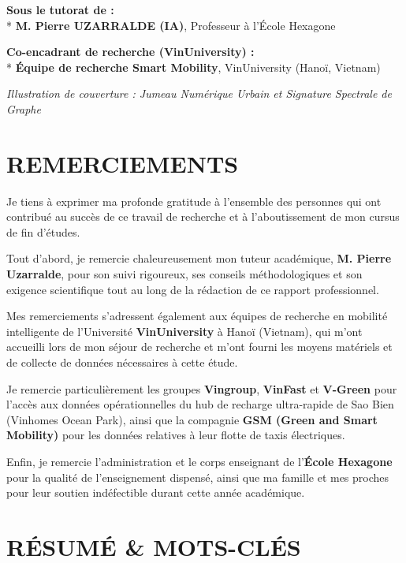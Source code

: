 \documentclass[10pt, a4paper]{article}
\begin{document}
\textbf{Sous le tutorat de :}\\
* \textbf{M. Pierre UZARRALDE (IA)}, Professeur à l'École Hexagone

\textbf{Co-encadrant de recherche (VinUniversity) :}\\
* \textbf{Équipe de recherche Smart Mobility}, VinUniversity (Hanoï,
Vietnam)

\emph{Illustration de couverture : Jumeau Numérique Urbain et Signature
Spectrale de Graphe}

\newpage

\section{REMERCIEMENTS}\label{remerciements}

Je tiens à exprimer ma profonde gratitude à l'ensemble des personnes qui
ont contribué au succès de ce travail de recherche et à l'aboutissement
de mon cursus de fin d'études.

Tout d'abord, je remercie chaleureusement mon tuteur académique,
\textbf{M. Pierre Uzarralde}, pour son suivi rigoureux, ses conseils
méthodologiques et son exigence scientifique tout au long de la
rédaction de ce rapport professionnel.

Mes remerciements s'adressent également aux équipes de recherche en
mobilité intelligente de l'Université \textbf{VinUniversity} à Hanoï
(Vietnam), qui m'ont accueilli lors de mon séjour de recherche et m'ont
fourni les moyens matériels et de collecte de données nécessaires à
cette étude.

Je remercie particulièrement les groupes \textbf{Vingroup},
\textbf{VinFast} et \textbf{V-Green} pour l'accès aux données
opérationnelles du hub de recharge ultra-rapide de Sao Bien (Vinhomes
Ocean Park), ainsi que la compagnie \textbf{GSM (Green and Smart
Mobility)} pour les données relatives à leur flotte de taxis
électriques.

Enfin, je remercie l'administration et le corps enseignant de
l'\textbf{École Hexagone} pour la qualité de l'enseignement dispensé,
ainsi que ma famille et mes proches pour leur soutien indéfectible
durant cette année académique.

\newpage

\section{RÉSUMÉ \& MOTS-CLÉS}\label{ruxe9sumuxe9-mots-cluxe9s}
\end{document}
